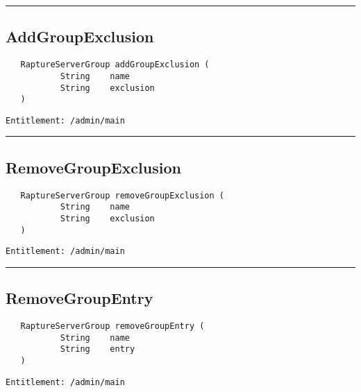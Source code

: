\rule{12cm}{2pt}
\subsection{AddGroupExclusion}
\label{Api:AddGroupExclusion}
\begin{verbatim}
   RaptureServerGroup addGroupExclusion (
           String    name
           String    exclusion
   )
\end{verbatim}
\begin{Verbatim}[fontsize=\small, formatcom=\color{Maroon}]
  Entitlement: /admin/main
\end{Verbatim}



\rule{12cm}{2pt}
\subsection{RemoveGroupExclusion}
\label{Api:RemoveGroupExclusion}
\begin{verbatim}
   RaptureServerGroup removeGroupExclusion (
           String    name
           String    exclusion
   )
\end{verbatim}
\begin{Verbatim}[fontsize=\small, formatcom=\color{Maroon}]
  Entitlement: /admin/main
\end{Verbatim}



\rule{12cm}{2pt}
\subsection{RemoveGroupEntry}
\label{Api:RemoveGroupEntry}
\begin{verbatim}
   RaptureServerGroup removeGroupEntry (
           String    name
           String    entry
   )
\end{verbatim}
\begin{Verbatim}[fontsize=\small, formatcom=\color{Maroon}]
  Entitlement: /admin/main
\end{Verbatim}



